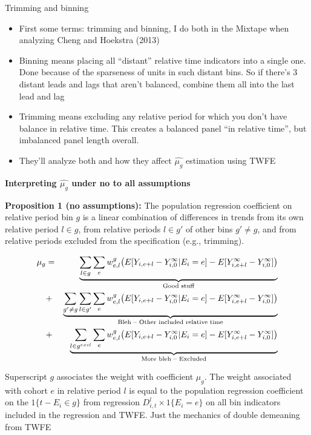 \documentclass{beamer}
\begin{document}
\begin{frame}{Trimming and binning}

\begin{itemize}
\item First some terms: trimming and binning, I do both in the Mixtape when analyzing Cheng and Hoekstra (2013)
\item Binning means placing all ``distant'' relative time indicators into a single one.  Done because of the sparseness of units in such distant bins. So if there's 3 distant leads and lags that aren't balanced, combine them all into the last lead and lag
\item Trimming means excluding any relative period for which you don't have balance in relative time. This creates a balanced panel ``in relative time'', but imbalanced panel length overall. 
\item They'll analyze both and how they affect $\widehat{\mu_g}$ estimation using TWFE
\end{itemize}

\end{frame}

\begin{frame}[plain, shrink=20]
\begin{center}
\textbf{Interpreting $\widehat{\mu_g}$ under no to all assumptions}
\end{center}

\textbf{Proposition 1 (no assumptions):} The population regression coefficient on relative period bin $g$ is a linear combination of differences in trends from its own relative period $l \in g$, from relative periods $l \in g'$ of other bins $g' \neq g$, and from relative periods excluded from the specification (e.g., trimming). 

\begin{eqnarray*}
\mu_g &=& \underbrace{\sum_{l \in g} \sum_{e} w^g_{e,l} \big ( E[Y_{i,e+l} - Y^{\infty}_{i,0} | E_i = e] - E[Y^{\infty}_{i,e+l} - Y^{\infty}_{i,0}] \big )}_{\mathclap{\text{Good stuff}}} \\
&+& \underbrace{\sum_{g' \neq g} \sum_{l \in g'} \sum_e w^g_{e,l} \big ( E[Y_{i,e+l} - Y^{\infty}_{i,0} | E_i=e] - E[Y^{\infty}_{i,e+l} - Y^{\infty}_{i,0}] \big )}_{\mathclap{\text{Bleh -- Other included relative time}}} \\
&+&  \underbrace{\sum_{l \in g^{excl}} \sum_{e} w^g_{e,l} \big ( E[Y_{i,e+l} - Y^{\infty}_{i,0} | E_i=e] - E[Y^{\infty}_{i,e+l} - Y^{\infty}_{i,0}] \big )}_{\mathclap{\text{More bleh -- Excluded}}} 
\end{eqnarray*}

\bigskip

Superscript $g$ associates the weight with coefficient $\mu_g$. The weight associated with cohort $e$ in relative period $l$ is equal to the population regression coefficient on the $1 \{t-E_i \in g \}$ from regression $D_{i,t}^l \times 1\{ E_i=e \}$ on all bin indicators included in the regression and TWFE. Just the mechanics of double demeaning from TWFE

\end{frame}
\end{document}
